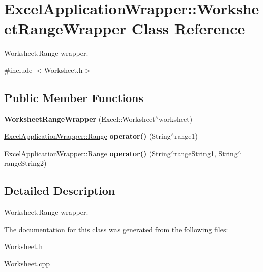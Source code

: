 \hypertarget{class_excel_application_wrapper_1_1_worksheet_range_wrapper}{}\section{Excel\+Application\+Wrapper\+:\+:Worksheet\+Range\+Wrapper Class Reference}
\label{class_excel_application_wrapper_1_1_worksheet_range_wrapper}


Worksheet.\+Range wrapper.  




{\ttfamily \#include $<$Worksheet.\+h$>$}

\subsection*{Public Member Functions}
\begin{DoxyCompactItemize}
\item 
\hypertarget{class_excel_application_wrapper_1_1_worksheet_range_wrapper_a57bbb52289fa007540f222bc989f340d}{}{\bfseries Worksheet\+Range\+Wrapper} (Excel\+::\+Worksheet$^\wedge$worksheet)\label{class_excel_application_wrapper_1_1_worksheet_range_wrapper_a57bbb52289fa007540f222bc989f340d}

\item 
\hypertarget{class_excel_application_wrapper_1_1_worksheet_range_wrapper_a7685431d659c1e22664dcdca16a28153}{}\hyperlink{class_excel_application_wrapper_1_1_range}{Excel\+Application\+Wrapper\+::\+Range} {\bfseries operator()} (String$^\wedge$range1)\label{class_excel_application_wrapper_1_1_worksheet_range_wrapper_a7685431d659c1e22664dcdca16a28153}

\item 
\hypertarget{class_excel_application_wrapper_1_1_worksheet_range_wrapper_a667ee5adeb6d223f63a74b2cbac470bc}{}\hyperlink{class_excel_application_wrapper_1_1_range}{Excel\+Application\+Wrapper\+::\+Range} {\bfseries operator()} (String$^\wedge$range\+String1, String$^\wedge$range\+String2)\label{class_excel_application_wrapper_1_1_worksheet_range_wrapper_a667ee5adeb6d223f63a74b2cbac470bc}

\end{DoxyCompactItemize}


\subsection{Detailed Description}
Worksheet.\+Range wrapper. 

The documentation for this class was generated from the following files\+:\begin{DoxyCompactItemize}
\item 
Worksheet.\+h\item 
Worksheet.\+cpp\end{DoxyCompactItemize}

